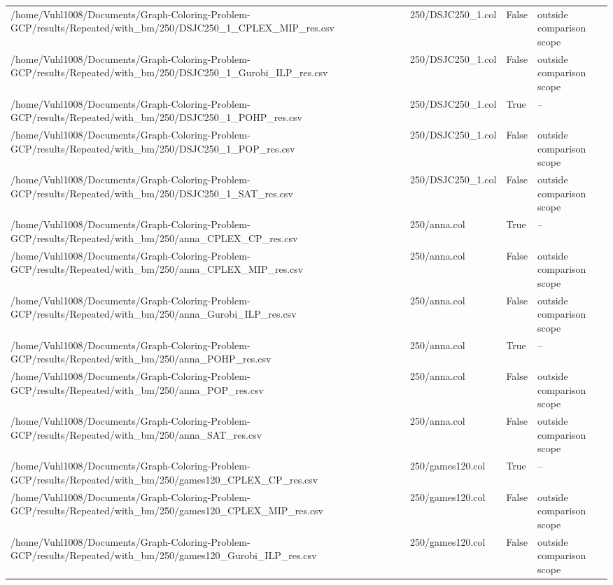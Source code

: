 \begin{table}[htbp]
\begin{tabular}{llll}
/home/Vuhl1008/Documents/Graph-Coloring-Problem-GCP/results/Repeated/with\_bm/250/DSJC250\_1\_CPLEX\_MIP\_res.csv & 250/DSJC250\_1.col & False & outside comparison scope \\
/home/Vuhl1008/Documents/Graph-Coloring-Problem-GCP/results/Repeated/with\_bm/250/DSJC250\_1\_Gurobi\_ILP\_res.csv & 250/DSJC250\_1.col & False & outside comparison scope \\
/home/Vuhl1008/Documents/Graph-Coloring-Problem-GCP/results/Repeated/with\_bm/250/DSJC250\_1\_POHP\_res.csv & 250/DSJC250\_1.col & True & -- \\
/home/Vuhl1008/Documents/Graph-Coloring-Problem-GCP/results/Repeated/with\_bm/250/DSJC250\_1\_POP\_res.csv & 250/DSJC250\_1.col & False & outside comparison scope \\
/home/Vuhl1008/Documents/Graph-Coloring-Problem-GCP/results/Repeated/with\_bm/250/DSJC250\_1\_SAT\_res.csv & 250/DSJC250\_1.col & False & outside comparison scope \\
/home/Vuhl1008/Documents/Graph-Coloring-Problem-GCP/results/Repeated/with\_bm/250/anna\_CPLEX\_CP\_res.csv & 250/anna.col & True & -- \\
/home/Vuhl1008/Documents/Graph-Coloring-Problem-GCP/results/Repeated/with\_bm/250/anna\_CPLEX\_MIP\_res.csv & 250/anna.col & False & outside comparison scope \\
/home/Vuhl1008/Documents/Graph-Coloring-Problem-GCP/results/Repeated/with\_bm/250/anna\_Gurobi\_ILP\_res.csv & 250/anna.col & False & outside comparison scope \\
/home/Vuhl1008/Documents/Graph-Coloring-Problem-GCP/results/Repeated/with\_bm/250/anna\_POHP\_res.csv & 250/anna.col & True & -- \\
/home/Vuhl1008/Documents/Graph-Coloring-Problem-GCP/results/Repeated/with\_bm/250/anna\_POP\_res.csv & 250/anna.col & False & outside comparison scope \\
/home/Vuhl1008/Documents/Graph-Coloring-Problem-GCP/results/Repeated/with\_bm/250/anna\_SAT\_res.csv & 250/anna.col & False & outside comparison scope \\
/home/Vuhl1008/Documents/Graph-Coloring-Problem-GCP/results/Repeated/with\_bm/250/games120\_CPLEX\_CP\_res.csv & 250/games120.col & True & -- \\
/home/Vuhl1008/Documents/Graph-Coloring-Problem-GCP/results/Repeated/with\_bm/250/games120\_CPLEX\_MIP\_res.csv & 250/games120.col & False & outside comparison scope \\
/home/Vuhl1008/Documents/Graph-Coloring-Problem-GCP/results/Repeated/with\_bm/250/games120\_Gurobi\_ILP\_res.csv & 250/games120.col & False & outside comparison scope \\

\end{tabular}
\end{table}
